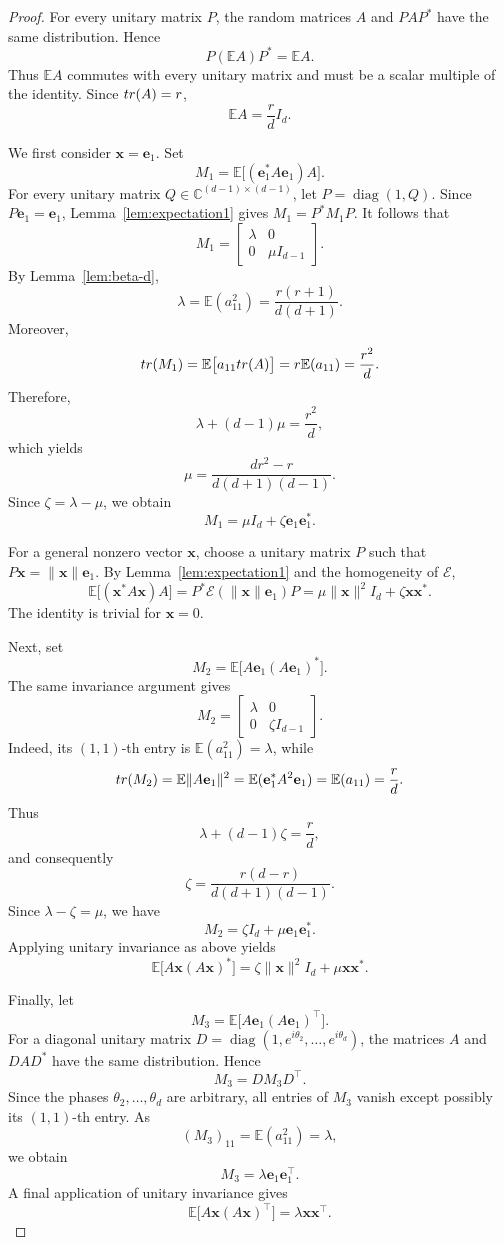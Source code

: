 \documentclass[10pt,a4paper]{amsart}
\newcommand{\C}{{\mathbb C}}
\newcommand{\E}{{\mathbb E}}
\newcommand{\tr}{{\rm tr}}
\newcommand{\ve}{{\mathbf e}}
\newcommand{\vx}{{\mathbf x}}
\begin{document}
	\begin{proof}
		For every unitary matrix $P$, the random matrices $A$ and $PAP^*$ have the same distribution. Hence
		\[
		P(\E A)P^*=\E A.
		\]
		Thus $\E A$ commutes with every unitary matrix and must be a scalar multiple of the identity. Since $\tr(A)=r$,
		\[
		\E A=\frac rd I_d.
		\]
		
		We first consider $\vx=\ve_1$. Set
		\[
		M_1=\E\big[(\ve_1^*A\ve_1)A\big].
		\]
		For every unitary matrix $Q\in\C^{(d-1)\times(d-1)}$, let $P=\operatorname{diag}(1,Q)$. Since $P\ve_1=\ve_1$, Lemma~\ref{lem:expectation1} gives $M_1=P^*M_1P$. It follows that
		\[
		M_1=\begin{bmatrix}\lambda&0\\0&\mu I_{d-1}\end{bmatrix}.
		\]
		By Lemma~\ref{lem:beta-d},
		\[
		\lambda=\E(a_{11}^2)=\frac{r(r+1)}{d(d+1)}.
		\]
		Moreover,
		\[
		\tr(M_1)=\E\big[a_{11}\tr(A)\big]=r\E(a_{11})=\frac{r^2}{d}.
		\]
		Therefore,
		\[
		\lambda+(d-1)\mu=\frac{r^2}{d},
		\]
		which yields
		\[
		\mu=\frac{dr^2-r}{d(d+1)(d-1)}.
		\]
		Since $\zeta=\lambda-\mu$, we obtain
		\[
		M_1=\mu I_d+\zeta \ve_1\ve_1^*.
		\]
		
		For a general nonzero vector $\vx$, choose a unitary matrix $P$ such that $P\vx=\|\vx\|\ve_1$. By Lemma~\ref{lem:expectation1} and the homogeneity of $\mathcal E$,
		\[
		\E\big[(\vx^*A\vx)A\big]=P^*\mathcal E(\|\vx\|\ve_1)P
		=\mu\|\vx\|^2I_d+\zeta\vx\vx^*.
		\]
		The identity is trivial for $\vx=0$.
		
		Next, set
		\[
		M_2=\E\big[A\ve_1(A\ve_1)^*\big].
		\]
		The same invariance argument gives
		\[
		M_2=\begin{bmatrix}\lambda&0\\0&\zeta I_{d-1}\end{bmatrix}.
		\]
		Indeed, its $(1,1)$-th entry is $\E(a_{11}^2)=\lambda$, while
		\[
		\tr(M_2)=\E\|A\ve_1\|^2=\E(\ve_1^*A^2\ve_1)=\E(a_{11})=\frac rd.
		\]
		Thus
		\[
		\lambda+(d-1)\zeta=\frac rd,
		\]
		and consequently
		\[
		\zeta=\frac{r(d-r)}{d(d+1)(d-1)}.
		\]
		Since $\lambda-\zeta=\mu$, we have
		\[
		M_2=\zeta I_d+\mu \ve_1\ve_1^*.
		\]
		Applying unitary invariance as above yields
		\[
		\E\big[A\vx(A\vx)^*\big]=\zeta\|\vx\|^2I_d+\mu\vx\vx^*.
		\]
		
		Finally, let
		\[
		M_3=\E\big[A\ve_1(A\ve_1)^\top\big].
		\]
		For a diagonal unitary matrix $D=\operatorname{diag}(1,e^{i\theta_2},\ldots,e^{i\theta_d})$, the matrices $A$ and $DAD^*$ have the same distribution. Hence
		\[
		M_3=DM_3D^\top.
		\]
		Since the phases $\theta_2,\ldots,\theta_d$ are arbitrary, all entries of $M_3$ vanish except possibly its $(1,1)$-th entry. As
		\[
		(M_3)_{11}=\E(a_{11}^2)=\lambda,
		\]
		we obtain
		\[
		M_3=\lambda \ve_1\ve_1^\top.
		\]
		A final application of unitary invariance gives
		\[
		\E\big[A\vx(A\vx)^\top\big]=\lambda\vx\vx^\top.
		\]
	\end{proof}
\end{document}
